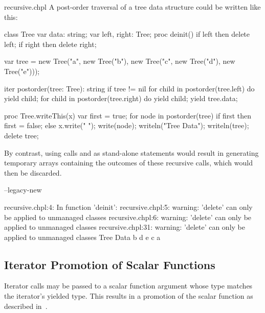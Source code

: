 \begin{chapelexample}{recursive.chpl}
A post-order traversal of a tree data structure could be written like this:
\begin{chapelnoprint}
class Tree {
  var data: string;
  var left, right: Tree;
  proc deinit() {
    if left then delete left;
    if right then delete right;
  }
}

var tree = new Tree("a", new Tree("b"), new Tree("c", new Tree("d"), new Tree("e")));
\end{chapelnoprint}
\begin{chapel}
iter postorder(tree: Tree): string {
  if tree != nil {
    for child in postorder(tree.left) do
      yield child;
    for child in postorder(tree.right) do
      yield child;
    yield tree.data;
  }
}
\end{chapel}
\begin{chapelnoprint}
proc Tree.writeThis(x)
{
  var first = true;
  for node in postorder(tree) {
    if first then first = false;
      else x.write(" ");
    write(node);
  }
}
writeln("Tree Data");
writeln(tree);
delete tree;
\end{chapelnoprint}
By contrast, using calls 
and  as stand-alone statements would
result in generating temporary arrays containing the outcomes of these
recursive calls, which would then be discarded.
\begin{chapelcompopts}
--legacy-new
\end{chapelcompopts}
\begin{chapeloutput}
recursive.chpl:4: In function 'deinit':
recursive.chpl:5: warning: 'delete' can only be applied to unmanaged classes
recursive.chpl:6: warning: 'delete' can only be applied to unmanaged classes
recursive.chpl:31: warning: 'delete' can only be applied to unmanaged classes
Tree Data
b d e c a
\end{chapeloutput}
\end{chapelexample}

\subsection{Iterator Promotion of Scalar Functions}
\label{Iterator_Promotion_of_Scalar_Functions}

Iterator calls may be passed to a scalar function argument whose type
matches the iterator's yielded type.  This results in a promotion of the
scalar function as described in~.

